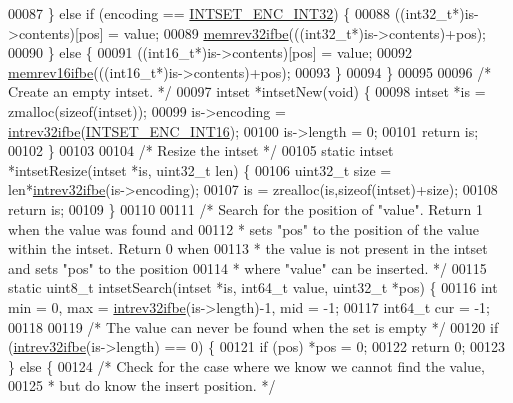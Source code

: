 \begin{DoxyCode}
00087     \} \textcolor{keywordflow}{else} \textcolor{keywordflow}{if} (encoding == \hyperlink{intset_8c_aa1aa222f55313754dadfb15b2a328f6b}{INTSET\_ENC\_INT32}) \{
00088         ((int32\_t*)is->contents)[pos] = value;
00089         \hyperlink{endianconv_8h_a771f3656eb7d11a1e7f7294b657d8978}{memrev32ifbe}(((int32\_t*)is->contents)+pos);
00090     \} \textcolor{keywordflow}{else} \{
00091         ((int16\_t*)is->contents)[pos] = value;
00092         \hyperlink{endianconv_8h_a49372891e83ab7a970f0d98dda1870d9}{memrev16ifbe}(((int16\_t*)is->contents)+pos);
00093     \}
00094 \}
00095 
00096 \textcolor{comment}{/* Create an empty intset. */}
00097 intset *intsetNew(\textcolor{keywordtype}{void}) \{
00098     intset *is = zmalloc(\textcolor{keyword}{sizeof}(intset));
00099     is->encoding = \hyperlink{endianconv_8h_a4e85d9ae58a3b1e6ceaabfd4689002c7}{intrev32ifbe}(\hyperlink{intset_8c_a60abb5e9fff1225d1f540718895eae90}{INTSET\_ENC\_INT16});
00100     is->length = 0;
00101     \textcolor{keywordflow}{return} is;
00102 \}
00103 
00104 \textcolor{comment}{/* Resize the intset */}
00105 \textcolor{keyword}{static} intset *intsetResize(intset *is, uint32\_t len) \{
00106     uint32\_t size = len*\hyperlink{endianconv_8h_a4e85d9ae58a3b1e6ceaabfd4689002c7}{intrev32ifbe}(is->encoding);
00107     is = zrealloc(is,\textcolor{keyword}{sizeof}(intset)+size);
00108     \textcolor{keywordflow}{return} is;
00109 \}
00110 
00111 \textcolor{comment}{/* Search for the position of "value". Return 1 when the value was found and}
00112 \textcolor{comment}{ * sets "pos" to the position of the value within the intset. Return 0 when}
00113 \textcolor{comment}{ * the value is not present in the intset and sets "pos" to the position}
00114 \textcolor{comment}{ * where "value" can be inserted. */}
00115 \textcolor{keyword}{static} uint8\_t intsetSearch(intset *is, int64\_t value, uint32\_t *pos) \{
00116     \textcolor{keywordtype}{int} min = 0, max = \hyperlink{endianconv_8h_a4e85d9ae58a3b1e6ceaabfd4689002c7}{intrev32ifbe}(is->length)-1, mid = -1;
00117     int64\_t cur = -1;
00118 
00119     \textcolor{comment}{/* The value can never be found when the set is empty */}
00120     \textcolor{keywordflow}{if} (\hyperlink{endianconv_8h_a4e85d9ae58a3b1e6ceaabfd4689002c7}{intrev32ifbe}(is->length) == 0) \{
00121         \textcolor{keywordflow}{if} (pos) *pos = 0;
00122         \textcolor{keywordflow}{return} 0;
00123     \} \textcolor{keywordflow}{else} \{
00124         \textcolor{comment}{/* Check for the case where we know we cannot find the value,}
00125 \textcolor{comment}{         * but do know the insert position. */}

\end{DoxyCode}
